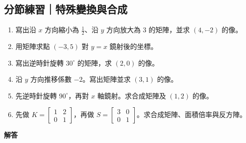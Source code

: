 \documentclass[11pt,a4paper]{article}
\providecommand{\tightlist}{%
  \setlength{\itemsep}{0pt}\setlength{\parskip}{0pt}}
\begin{document}
\begin{HandoutSelfCheck}

\subsection{分節練習｜特殊變換與合成}\label{ux5206ux7bc0ux7df4ux7fd2ux7279ux6b8aux8b8aux63dbux8207ux5408ux6210}

\begin{enumerate}
\def\labelenumi{\arabic{enumi}.}
\tightlist
\item
  寫出沿 \(x\) 方向縮小為 \(\frac12\)、沿 \(y\) 方向放大為 \(3\) 的矩陣，並求 \((4,-2)\) 的像。
\item
  用矩陣求點 \((-3,5)\) 對 \(y=x\) 鏡射後的坐標。
\item
  寫出逆時針旋轉 \(30^\circ\) 的矩陣，求 \((2,0)\) 的像。
\item
  沿 \(y\) 方向推移係數 \(-2\)。寫出矩陣並求 \((3,1)\) 的像。
\item
  先逆時針旋轉 \(90^\circ\)，再對 \(x\) 軸鏡射。求合成矩陣及 \((1,2)\) 的像。
\item
  先做 \(K=\begin{bmatrix}1&2\\0&1\end{bmatrix}\)，再做 \(S=\begin{bmatrix}3&0\\0&1\end{bmatrix}\)。求合成矩陣、面積倍率與反方陣。
\end{enumerate}

\textbf{解答}


\end{HandoutSelfCheck}
\end{document}
